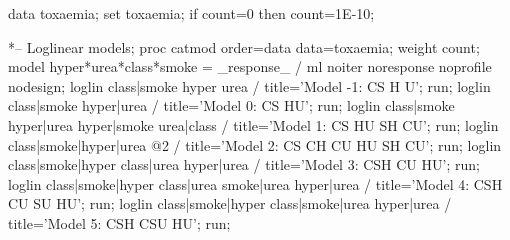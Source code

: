 \begin{listing}
data toxaemia;
   set toxaemia;
   if count=0 then count=1E-10;

*-- Loglinear models;
proc catmod order=data
            data=toxaemia;
   weight count;
   model hyper*urea*class*smoke =  _response_ /
      ml noiter noresponse noprofile nodesign;
   loglin  class|smoke hyper urea / title='Model -1: CS  H  U';
run;
   loglin  class|smoke hyper|urea / title='Model 0: CS  HU';
run;
   loglin  class|smoke  hyper|urea  hyper|smoke  urea|class /
       title='Model 1: CS  HU  SH  CU';
run;
   loglin  class|smoke|hyper|urea @2 /
       title='Model 2: CS  CH  CU  HU  SH  CU';
run;
   loglin class|smoke|hyper  class|urea  hyper|urea /
       title='Model 3: CSH  CU  HU';
run;
   loglin class|smoke|hyper  class|urea  smoke|urea  hyper|urea /
       title='Model 4: CSH  CU  SU  HU';
run;
   loglin class|smoke|hyper  class|smoke|urea  hyper|urea /
       title='Model 5: CSH  CSU  HU';
run;
\end{listing}
